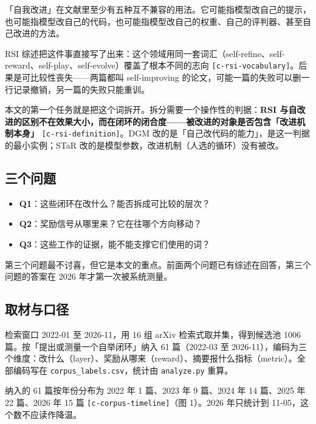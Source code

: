 「自我改进」在文献里至少有五种互不兼容的用法。它可能指模型改自己的提示，也可能指模型改自己的代码，也可能指模型改自己的权重、自己的评判器、甚至自己改进的方法。


RSI 综述把这件事直接写了出来：这个领域用同一套词汇（self-refine、self-reward、self-play、self-evolve）覆盖了根本不同的志向 {\scriptsize\texttt{[c-\hspace{0pt}rsi-\hspace{0pt}vocabulary]}}。后果是可比较性丧失——两篇都叫 self-improving 的论文，可能一篇的失败可以删一行记录撤销，另一篇的失败只能重训。


本文的第一个任务就是把这个词拆开。拆分需要一个操作性的判据：\textbf{RSI 与自改进的区别不在效果大小，而在闭环的闭合度——被改进的对象是否包含「改进机制本身」} {\scriptsize\texttt{[c-\hspace{0pt}rsi-\hspace{0pt}definition]}}。DGM 改的是「自己改代码的能力」，是这一判据的最小实例；STaR 改的是模型参数，改进机制（人选的循环）没有被改。


\subsection{三个问题}

\begin{itemize}
  \item \textbf{Q1}：这些闭环在改什么？能否拆成可比较的层次？
  \item \textbf{Q2}：奖励信号从哪里来？它在往哪个方向移动？
  \item \textbf{Q3}：这些工作的证据，能不能支撑它们使用的词？
\end{itemize}

第三个问题最不讨喜，但它是本文的重点。前面两个问题已有综述在回答，第三个问题的答案在 2026 年才第一次被系统测量。


\subsection{取材与口径}

检索窗口 2022-01 至 2026-11，用 16 组 arXiv 检索式取并集，得到候选池 1006 篇。按「提出或测量一个自举闭环」纳入 61 篇（2022-03 至 2026-11），编码为三个维度：改什么（layer）、奖励从哪来（reward）、摘要报什么指标（metric）。全部编码写在 \texttt{corpus\_labels.csv}，统计由 \texttt{analyze.py} 重算。


纳入的 61 篇按年份分布为 2022 年 1 篇、2023 年 9 篇、2024 年 14 篇、2025 年 22 篇、2026 年 15 篇 {\scriptsize\texttt{[c-\hspace{0pt}corpus-\hspace{0pt}timeline]}}（图 1）。2026 年只统计到 11-05，这个数不应读作降温。



